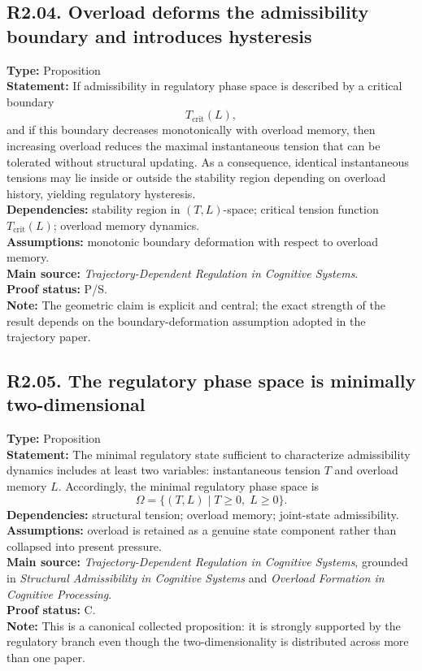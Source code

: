 \documentclass[12pt]{article}
\begin{document}
	\subsection*{R2.04. Overload deforms the admissibility boundary and introduces hysteresis}
	\textbf{Type:} Proposition \\
	\textbf{Statement:} If admissibility in regulatory phase space is described by a critical
	boundary
	\[
	T_{\mathrm{crit}}(L),
	\]
	and if this boundary decreases monotonically with overload memory, then increasing overload
	reduces the maximal instantaneous tension that can be tolerated without structural updating.
	As a consequence, identical instantaneous tensions may lie inside or outside the stability
	region depending on overload history, yielding regulatory hysteresis. \\
	\textbf{Dependencies:} stability region in $(T,L)$-space; critical tension function
	$T_{\mathrm{crit}}(L)$; overload memory dynamics. \\
	\textbf{Assumptions:} monotonic boundary deformation with respect to overload memory. \\
	\textbf{Main source:} \emph{Trajectory-Dependent Regulation in Cognitive Systems}. \\
	\textbf{Proof status:} P/S. \\
	\textbf{Note:} The geometric claim is explicit and central; the exact strength of the result
	depends on the boundary-deformation assumption adopted in the trajectory paper.
	
	\subsection*{R2.05. The regulatory phase space is minimally two-dimensional}
	\textbf{Type:} Proposition \\
	\textbf{Statement:} The minimal regulatory state sufficient to characterize admissibility
	dynamics includes at least two variables: instantaneous tension $T$ and overload memory $L$.
	Accordingly, the minimal regulatory phase space is
	\[
	\Omega = \{(T,L)\mid T \ge 0,\; L \ge 0\}.
	\]
	\textbf{Dependencies:} structural tension; overload memory; joint-state admissibility. \\
	\textbf{Assumptions:} overload is retained as a genuine state component rather than collapsed
	into present pressure. \\
	\textbf{Main source:} \emph{Trajectory-Dependent Regulation in Cognitive Systems}, grounded in
	\emph{Structural Admissibility in Cognitive Systems} and \emph{Overload Formation in Cognitive Processing}. \\
	\textbf{Proof status:} C. \\
	\textbf{Note:} This is a canonical collected proposition: it is strongly supported by the
	regulatory branch even though the two-dimensionality is distributed across more than one paper.
	
\end{document}
